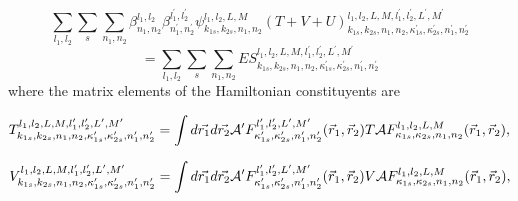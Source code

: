 \begin{equation}
	\sum_{l_{1},l_{2}}\sum_{s}\sum_{n_{1},n_{2}} \beta_{n_{1},n_{2}}^{l_{1},l_{2}} \beta_{n_{1}^{\prime},n_{2}^{\prime}}^{l_{1}^{\prime},l_{2}^{\prime}} \psi_{k_{1s},k_{2s},n_{1},n_{2}}^{l_{1},l_{2},L,M} (T+V+U)_{k_{1s},k_{2s},n_{1},n_{2},\kappa_{1s}^{\prime}, \kappa_{2s}^{\prime},n_{1}^{\prime},n_{2}^{\prime}}^{l_{1},l_{2},L,M,l_{1}^{\prime},l_{2}^{\prime},L^{\prime},M^{\prime}}  
\end{equation}
\begin{equation}
	=\sum_{l_{1},l_{2}}\sum_{s}\sum_{n_{1},n_{2}} ES_{k_{1s},k_{2s},n_{1},n_{2},\kappa_{1s}^{\prime}, \kappa_{2s}^{\prime},n_{1}^{\prime},n_{2}^{\prime}}^{l_{1},l_{2},L,M,l_{1}^{\prime},l_{2}^{\prime},L^{\prime},M^{\prime}}
\end{equation}
where the matrix elements of the Hamiltonian constituyents are

\begin{equation}		
	T_{k_{1s},k_{2s},n_{1},n_{2},\kappa_{1s}^{\prime}, \kappa_{2s}^{\prime},n_{1}^{\prime},n_{2}^{\prime}}^{l_{1},l_{2},L,M,l_{1}^{\prime},l_{2}^{\prime},L^{\prime},M^{\prime}}=\int d\vec{r_{1}}d\vec{r_{2}} {\cal A}^{\prime} F_{\kappa_{1s}^{\prime}, \kappa_{2s}^{\prime},n_{1}^{\prime},n_{2}^{\prime}}^{l_{1}^{\prime},l_{2}^{\prime},L^{\prime},M^{\prime}}(\vec{r}_{1},\vec{r}_{2}) T {\cal A}  F_{\kappa_{1s}, \kappa_{2s},n_{1},n_{2}}^{l_{1},l_{2},L,M}(\vec{r}_{1},\vec{r}_{2}),
\end{equation}

\begin{equation}		
V_{k_{1s},k_{2s},n_{1},n_{2},\kappa_{1s}^{\prime}, \kappa_{2s}^{\prime},n_{1}^{\prime},n_{2}^{\prime}}^{l_{1},l_{2},L,M,l_{1}^{\prime},l_{2}^{\prime},L^{\prime},M^{\prime}}=\int d\vec{r_{1}}d\vec{r_{2}} {\cal A}^{\prime} F_{\kappa_{1s}^{\prime}, \kappa_{2s}^{\prime},n_{1}^{\prime},n_{2}^{\prime}}^{l_{1}^{\prime},l_{2}^{\prime},L^{\prime},M^{\prime}}(\vec{r}_{1},\vec{r}_{2}) V {\cal A}  F_{\kappa_{1s}, \kappa_{2s},n_{1},n_{2}}^{l_{1},l_{2},L,M}(\vec{r}_{1},\vec{r}_{2}),
\end{equation}


